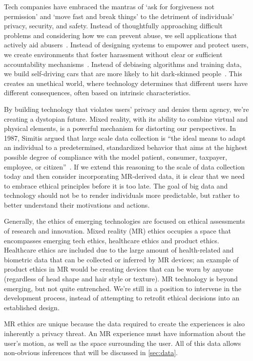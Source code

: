 Tech companies have embraced the mantras of `ask for forgiveness not permission' and `move fast and break things' to the detriment of individuals' privacy, security, and safety. Instead of thoughtfully approaching difficult problems and considering how we can prevent abuse, we sell applications that actively aid abusers~\cite{dell}. Instead of designing systems to empower and protect users, we create environments that foster harassment without clear or sufficient accountability mechanisms~\cite{dreyfuss}. Instead of debiasing algorithms and training data, we build self-driving cars that are more likely to hit dark-skinned people~\cite{wilson2019predictive}. This creates an unethical world, where technology determines that different users have different consequences, often based on intrinsic characteristics.

By building technology that violates users' privacy and denies them agency, we're creating a dystopian future. Mixed reality, with its ability to combine virtual and physical elements, is a powerful mechanism for distorting our perspectives.  In 1987, Simitis argued that large scale data collection is ``the ideal means to adapt an individual to a predetermined, standardized behavior that aims at the highest possible degree of compliance with the model patient, consumer, taxpayer, employee, or citizen''~\cite{simitis}. If we extend this reasoning to the scale of data collection today and then consider incorporating MR-derived data, it is clear that we need to embrace ethical principles before it is too late. The goal of big data and technology should not be to render individuals more predictable, but rather to better understand their motivations and actions.

Generally, the ethics of emerging technologies are focused on ethical assessments of research and innovation. Mixed reality (MR) ethics occupies a space that encompasses emerging tech ethics, healthcare ethics and product ethics. Healthcare ethics are included due to the large amount of health-related and biometric data that can be collected or inferred by MR devices; an example of product ethics in MR would be creating devices that can be worn by anyone (regardless of head shape and hair style or texture). MR technology is beyond emerging, but not quite entrenched. We're still in a position to intervene in the development process, instead of attempting to retrofit ethical decisions into an established design.

MR ethics are unique because the data required to create the experiences is also inherently a privacy threat. An MR experience must have information about the user's motion, as well as the space surrounding the user. All of this data allows non-obvious inferences that will be discussed in \autoref{sec:data}.


